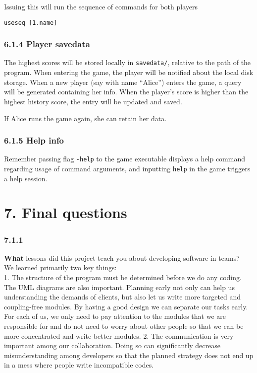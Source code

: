 \documentclass[
]{article}
\begin{document}
Issuing this will run the sequence of commands for both players

\begin{verbatim}
useseq [1.name]
\end{verbatim}

\hypertarget{player-savedata}{%
\subsubsection{6.1.4 Player savedata}\label{player-savedata}}

The highest scores will be stored locally in \texttt{savedata/},
relative to the path of the program. When entering the game, the player
will be notified about the local disk storage. When a new player (say
with name ``Alice'') enters the game, a query will be generated
containing her info. When the player's score is higher than the highest
history score, the entry will be updated and saved.

If Alice runs the game again, she can retain her data.

\hypertarget{help-info}{%
\subsubsection{6.1.5 Help info}\label{help-info}}

Remember passing flag \texttt{-help} to the game executable displays a
help command regarding usage of command arguments, and inputting
\texttt{help} in the game triggers a help session.

\hypertarget{final-questions}{%
\section{7. Final questions}\label{final-questions}}

\hypertarget{section-4}{%
\subsubsection{7.1.1}\label{section-4}}

\textbf{What} lessons did this project teach you about developing
software in teams?\\
We learned primarily two key things:\\
1. The structure of the program must be determined before we do any
coding. The UML diagrams are also important. Planning early not only can
help us understanding the demands of clients, but also let us write more
targeted and coupling-free modules. By having a good design we can
separate our tasks early. For each of us, we only need to pay attention
to the modules that we are responsible for and do not need to worry
about other people so that we can be more concentrated and write better
modules. 2. The communication is very important among our collaboration.
Doing so can significantly decrease misunderstanding among developers so
that the planned strategy does not end up in a mess where people write
incompatible codes.
\end{document}
